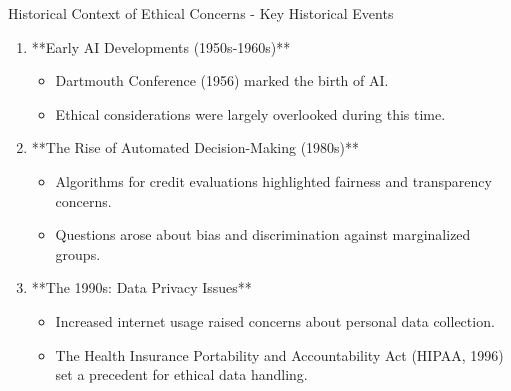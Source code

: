 \documentclass[aspectratio=169]{beamer}
\begin{document}
\begin{frame}[fragile]{Historical Context of Ethical Concerns - Key Historical Events}
    \begin{enumerate}
        \item **Early AI Developments (1950s-1960s)**
            \begin{itemize}
                \item Dartmouth Conference (1956) marked the birth of AI.
                \item Ethical considerations were largely overlooked during this time.
            \end{itemize}
        \item **The Rise of Automated Decision-Making (1980s)**
            \begin{itemize}
                \item Algorithms for credit evaluations highlighted fairness and transparency concerns.
                \item Questions arose about bias and discrimination against marginalized groups.
            \end{itemize}
        \item **The 1990s: Data Privacy Issues**
            \begin{itemize}
                \item Increased internet usage raised concerns about personal data collection.
                \item The Health Insurance Portability and Accountability Act (HIPAA, 1996) set a precedent for ethical data handling.
            \end{itemize}
    \end{enumerate}
\end{frame}
\end{document}
